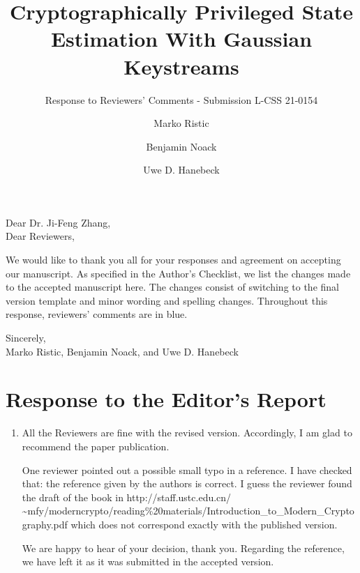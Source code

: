 \documentclass[a4paper]{scrartcl}
\title{\boldmath Cryptographically Privileged State Estimation With Gaussian Keystreams}
\subtitle{Response to Reviewers' Comments - Submission L-CSS 21-0154}
\author{Marko Ristic\and Benjamin Noack\and Uwe D. Hanebeck}
\newenvironment{rebuttal}{\begin{enumerate}[label={\color{grey}\thesection.\arabic{enumi}},leftmargin=0pt,ref=\thesection.\arabic{enumi}]}{\end{enumerate}}
\newcommand{\reviewtext}[1]{{\color{nblue} #1}}
\begin{document}
\maketitle

Dear Dr. Ji-Feng Zhang,\\
Dear Reviewers,

We would like to thank you all for your responses and agreement on accepting our manuscript. As specified in the Author's Checklist, we list the changes made to the accepted manuscript here. The changes consist of switching to the final version template and minor wording and spelling changes. Throughout this response, reviewers' comments are in \reviewtext{blue}. 

Sincerely,\\
Marko Ristic, Benjamin Noack, and Uwe D. Hanebeck


\section*{Response to the Editor's Report}
\def\thesection{E}
\begin{rebuttal} %
\item \reviewtext{All the Reviewers are fine with the revised version. Accordingly, I am glad to recommend the paper publication. 

One reviewer pointed out a possible small typo in a reference. I have checked that: the reference given by the authors is correct. I guess the reviewer found the draft of the book in http://staff.ustc.edu.cn/\\\~{}mfy/moderncrypto/reading\%20materials/Introduction\_to\_Modern\_Cryptography.pdf which does not correspond exactly with the published version.}

We are happy to hear of your decision, thank you. Regarding the reference, we have left it as it was submitted in the accepted version.

\end{rebuttal}

\end{document}
